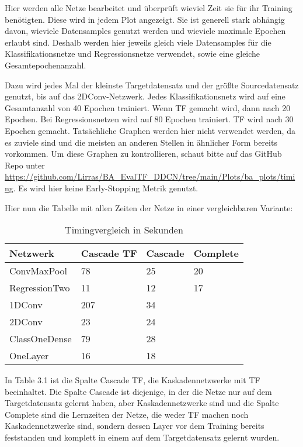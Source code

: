 Hier werden alle Netze bearbeitet und überprüft wieviel Zeit sie für ihr Training benötigten. 
Diese wird in jedem Plot angezeigt. Sie ist generell stark abhängig davon, wieviele Datensamples genutzt werden und 
wieviele maximale Epochen erlaubt sind. Deshalb werden hier jeweils gleich viele Datensamples für die Klassifikationsnetze und 
Regressionsnetze verwendet, sowie eine gleiche Gesamtepochenanzahl. 

Dazu wird jedes Mal der kleinste Targetdatensatz und der größte Sourcedatensatz genutzt, bis auf das 2DConv-Netzwerk. Jedes Klassifikationsnetz 
wird auf eine Gesamtanzahl von 40 Epochen trainiert. Wenn TF gemacht wird, dann nach 20 Epochen. Bei Regressionsnetzen wird auf 80 Epochen 
trainiert. TF wird nach 30 Epochen gemacht. Tatsächliche Graphen werden hier nicht verwendet werden, da es zuviele sind und die meisten an 
anderen Stellen in ähnlicher Form bereits vorkommen. Um diese Graphen zu kontrollieren, schaut bitte auf das GitHub Repo unter 
\url{https://github.com/Lirras/BA_EvalTF_DDCN/tree/main/Plots/ba_plots/timing}. 
Es wird hier keine Early-Stopping Metrik genutzt. 

Hier nun die Tabelle mit allen Zeiten der Netze in einer vergleichbaren Variante: \newline

\begin{table}[h!]
    \begin{center}
        \caption{Timingvergleich in Sekunden}
        \label{tab:time}
        \begin{tabular}{l|l|l|l}
            \textbf{Netzwerk} & \textbf{Cascade TF} & \textbf{Cascade} & \textbf{Complete} \\
            \hline
            ConvMaxPool & 78 & 25 & 20 \\
            RegressionTwo & 11 & 12 & 17 \\
            1DConv & 207 & 34 \\
            2DConv & 23 & 24 \\
            ClassOneDense & 79 & 28 \\
            OneLayer & 16 & 18
        \end{tabular}
    \end{center}
\end{table}

In Table 3.1 ist die Spalte Cascade TF, die Kaskadennetzwerke mit TF beeinhaltet. Die Spalte Cascade ist diejenige, in der die Netze nur auf dem 
Targetdatensatz gelernt haben, aber Kaskadennetzwerke sind und die Spalte Complete sind die Lernzeiten der Netze, die weder TF machen noch 
Kaskadennetzwerke sind, sondern dessen Layer vor dem Training bereits feststanden und komplett in einem auf dem Targetdatensatz gelernt wurden. 

